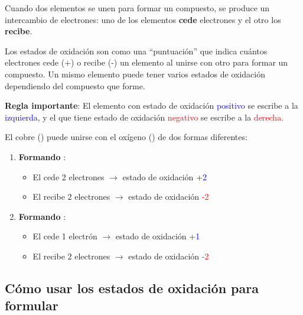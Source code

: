 Cuando dos elementos se unen para formar un compuesto, se produce un intercambio de electrones: uno de los elementos \textbf{cede} electrones y el otro los \textbf{recibe}.

\begin{definition}
        Los estados de oxidación son como una ``puntuación'' que indica cuántos electrones cede (+) o recibe (-) un elemento al unirse con otro para formar un compuesto. Un mismo elemento puede tener varios estados de oxidación dependiendo del compuesto que forme.

        \textbf{Regla importante}: El elemento con estado de oxidación \textcolor{blue}{positivo} se escribe a la \textcolor{blue}{izquierda}, y el que tiene estado de oxidación \textcolor{red}{negativo} se escribe a la \textcolor{red}{derecha}.
\end{definition}
\vspace{8pt}

\begin{example}
    El cobre () puede unirse con el oxígeno () de dos formas diferentes:
    \begin{enumerate}[label=\letraminuscula]
            \item \textbf{Formando }:
            \begin{itemize}
                \item El  cede 2 electrones $\rightarrow$ estado de oxidación \textcolor{blue}{+2}
                \item El  recibe 2 electrones $\rightarrow$ estado de oxidación \textcolor{red}{-2}
            \end{itemize}

            \item \textbf{Formando }:
            \begin{itemize}
                \item El  cede 1 electrón $\rightarrow$ estado de oxidación \textcolor{blue}{+1}
                \item El  recibe 2 electrones $\rightarrow$ estado de oxidación \textcolor{red}{-2}
            \end{itemize}
    \end{enumerate}
\end{example}

\subsection{Cómo usar los estados de oxidación para formular}

